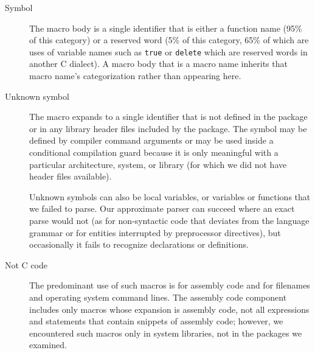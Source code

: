 \documentclass[10pt]{article}
\begin{document}
\begin{description}
\item[Symbol]
  The macro body is a single identifier that is either a function name
  (95\% of this category) or a reserved word (5\% of this category, 65\% of
  which are uses of variable names such as {\tt true} or {\tt delete} which
  are reserved words in another C dialect).  A macro body that is a macro
  name inherits that macro name's categorization rather than appearing
  here.


\item[Unknown symbol]
  The macro expands to a single identifier that is not defined in the package
  or in any library header files included by the package.  The symbol may
  be defined by compiler command arguments or may be used inside a
  conditional compilation guard because it is only meaningful 
  with a particular architecture, system, or library (for which we did not
  have header files available).
  
  Unknown symbols can also be local variables, or variables or functions that we failed to
  parse.  Our approximate parser can succeed where an exact parse would not
  (as for non-syntactic code that deviates from the language grammar
  or for entities interrupted by preprocessor
  directives), but occasionally it fails to recognize declarations or
  definitions.

\item[Not C code]\label{page:not-c-code}
  The predominant use of such macros is for assembly code and for filenames
  and operating system command lines.  The assembly code component includes
  only macros whose expansion is assembly code, not all expressions and
  statements that contain snippets of assembly code; however, we
  encountered such macros only in system libraries, not in the packages we
  examined.  
  

\end{description}
\end{document}
